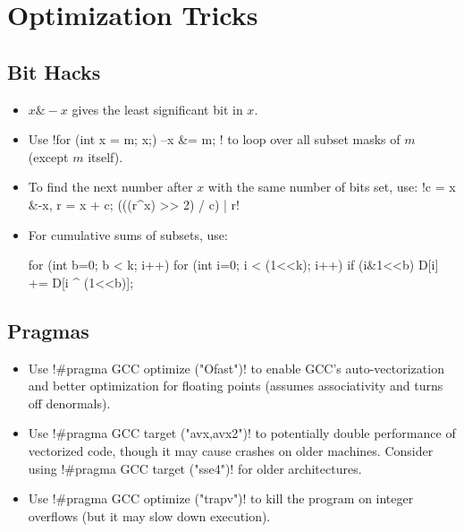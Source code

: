 \section{Optimization Tricks}

\subsection{Bit Hacks}
\begin{itemize}
    \item \( x \& -x \) gives the least significant bit in \( x \).
    \item Use \inlinecode!for (int x = m; x;) { --x &= m; }! to loop over all subset
          masks of \( m \) (except \( m \) itself).
    \item To find the next number after \( x \) with the same number of bits set, use:
          \inlinecode!c = x &-x, r = x + c; (((r^x) >> 2) / c) | r!
    \item For cumulative sums of subsets, use:
          \begin{codesnippet}
    for (int b=0; b < k; i++)
        for (int i=0; i < (1<<k); i++) 
            if (i&1<<b) D[i] += D[i ^ (1<<b)]; 
          \end{codesnippet}
\end{itemize}

\subsection{Pragmas}
\begin{itemize}
    \item Use \inlinecode!#pragma GCC optimize ("Ofast")! to enable GCC's
          auto-vectorization and better optimization for floating points (assumes
          associativity and turns off denormals).
    \item Use \inlinecode!#pragma GCC target ("avx,avx2")! to potentially double
          performance of vectorized code, though it may cause crashes on older machines.
          Consider using \inlinecode!#pragma GCC target ("sse4")! for older
          architectures.
    \item Use \inlinecode!#pragma GCC optimize ("trapv")! to kill the program on integer
          overflows (but it may slow down execution).
\end{itemize}